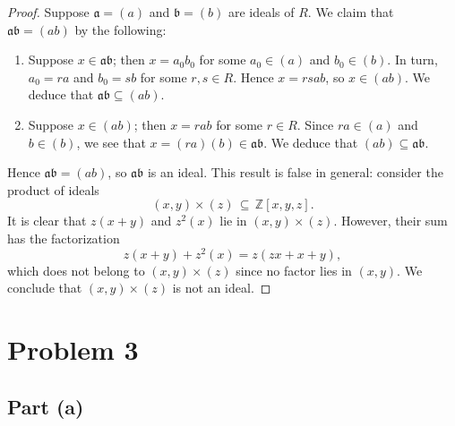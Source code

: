 \documentclass[11pt]{article}
\begin{document}
\begin{proof}
  Suppose $\mathfrak{a} = (a)$ and $\mathfrak{b} = (b)$ are ideals of $R$. We claim that $\mathfrak{ab} = (ab)$ by the following:
  \begin{enumerate}
    \item Suppose $x \in \mathfrak{ab}$; then $x = a_{0}b_{0}$ for some $a_{0} \in (a)$ and $b_{0} \in (b)$. In turn, $a_{0} = ra$ and $b_{0} = sb$ for some $r, s \in R$. Hence $x = rsab$, so $x \in (ab)$. We deduce that $\mathfrak{ab} \subseteq (ab)$.
    \item Suppose $x \in (ab)$; then $x = rab$ for some $r \in R$. Since $ra \in (a)$ and $b \in (b)$, we see that $x = (ra)(b) \in \mathfrak{ab}$. We deduce that $(ab) \subseteq \mathfrak{ab}$.
  \end{enumerate}
  Hence $\mathfrak{ab} = (ab)$, so $\mathfrak{ab}$ is an ideal. This result is false in general: consider the product of ideals
  \[
    \boxed{(x, y) \times (z) \, \subseteq \, \mathbb{Z}[x, y, z]}.
  \]  
  It is clear that $z(x + y)$ and $z^{2}(x)$ lie in $(x, y) \times (z)$. However, their sum has the factorization
  \[
    z(x + y) + z^{2}(x) = z (zx + x + y),
  \]
  which does not belong to $(x, y) \times (z)$ since no factor lies in $(x, y)$. We conclude that $(x, y) \times (z)$ is not an ideal.

\end{proof}


\section{Problem 3}


\subsection*{Part (a)}
\end{document}

